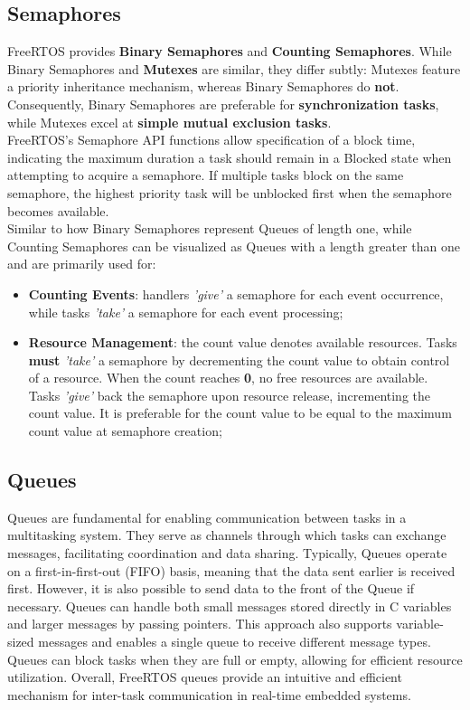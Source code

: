\documentclass{article}
\begin{document}
\subsection{Semaphores}
FreeRTOS provides \textbf{Binary Semaphores} and \textbf{Counting Semaphores}. While Binary Semaphores and \textbf{Mutexes} are similar, they differ subtly: Mutexes feature a priority inheritance mechanism, whereas Binary Semaphores do \textbf{not}. Consequently, Binary Semaphores are preferable for \textbf{synchronization tasks}, while Mutexes excel at \textbf{simple mutual exclusion tasks}.\\[0.1cm]
FreeRTOS's Semaphore API functions allow specification of a block time, indicating the maximum duration a task should remain in a Blocked state when attempting to acquire a semaphore. If multiple tasks block on the same semaphore, the highest priority task will be unblocked first when the semaphore becomes available.\\[0.1cm]
Similar to how Binary Semaphores represent Queues of length one, while Counting Semaphores can be visualized as Queues with a length greater than one and are primarily used for:
\begin{itemize}
    \item\textbf{Counting Events}: handlers \textit{'give'} a semaphore for each event occurrence, while tasks \textit{'take'} a semaphore for each event processing;%
    
    \item\textbf{Resource Management}: the count value denotes available resources. Tasks \textbf{must} \textit{'take'} a semaphore by decrementing the count value to obtain control of a resource. When the count reaches \textbf{0}, no free resources are available. Tasks \textit{'give'} back the semaphore upon resource release, incrementing the count value. It is preferable for the count value to be equal to the maximum count value at semaphore creation;
\end{itemize}


\subsection{Queues}
Queues are fundamental for enabling communication between tasks in a multitasking system. They serve as channels through which tasks can exchange messages, facilitating coordination and data sharing. Typically, Queues operate on a first-in-first-out (FIFO) basis, meaning that the data sent earlier is received first. However, it is also possible to send data to the front of the Queue if necessary. Queues can handle both small messages stored directly in C variables and larger messages by passing pointers. This approach also supports variable-sized messages and enables a single queue to receive different message types. Queues can block tasks when they are full or empty, allowing for efficient resource utilization. Overall, FreeRTOS queues provide an intuitive and efficient mechanism for inter-task communication in real-time embedded systems.
\end{document}

